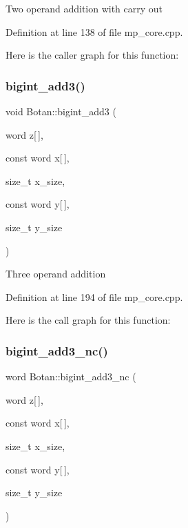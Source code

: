 Two operand addition with carry out 

Definition at line 138 of file mp\+\_\+core.\+cpp.

Here is the caller graph for this function\+:
\mbox{\label{namespace_botan_a2b90c82b13db8553eaa2701a8dd5975f}} 
\subsubsection{\texorpdfstring{bigint\+\_\+add3()}{bigint\_add3()}}
{\footnotesize\ttfamily void Botan\+::bigint\+\_\+add3 (\begin{DoxyParamCaption}\item[{word}]{z\mbox{[}$\,$\mbox{]},  }\item[{const word}]{x\mbox{[}$\,$\mbox{]},  }\item[{size\+\_\+t}]{x\+\_\+size,  }\item[{const word}]{y\mbox{[}$\,$\mbox{]},  }\item[{size\+\_\+t}]{y\+\_\+size }\end{DoxyParamCaption})}

Three operand addition 

Definition at line 194 of file mp\+\_\+core.\+cpp.

Here is the call graph for this function\+:
\mbox{\label{namespace_botan_ac6b0c61acfab2f864b2cf3999ca76c01}} 
\subsubsection{\texorpdfstring{bigint\+\_\+add3\+\_\+nc()}{bigint\_add3\_nc()}}
{\footnotesize\ttfamily word Botan\+::bigint\+\_\+add3\+\_\+nc (\begin{DoxyParamCaption}\item[{word}]{z\mbox{[}$\,$\mbox{]},  }\item[{const word}]{x\mbox{[}$\,$\mbox{]},  }\item[{size\+\_\+t}]{x\+\_\+size,  }\item[{const word}]{y\mbox{[}$\,$\mbox{]},  }\item[{size\+\_\+t}]{y\+\_\+size }\end{DoxyParamCaption})}

